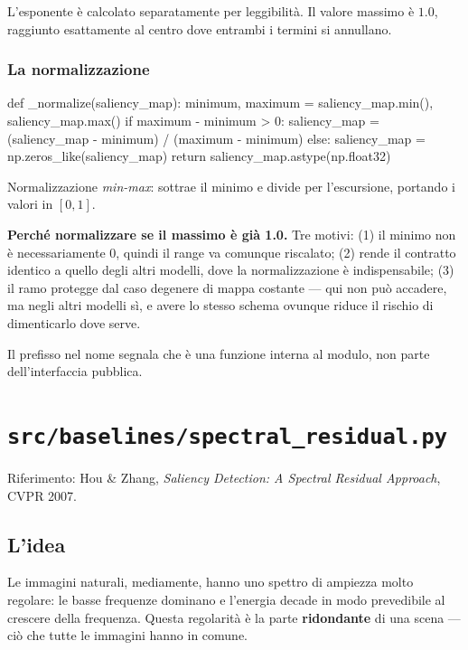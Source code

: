 L'esponente è calcolato separatamente per leggibilità. Il valore massimo è $1.0$, raggiunto
esattamente al centro dove entrambi i termini si annullano.

\subsubsection{La normalizzazione}

\begin{idebox}
\begin{pycode}
def _normalize(saliency_map):
    minimum, maximum = saliency_map.min(), saliency_map.max()
    if maximum - minimum > 0:
        saliency_map = (saliency_map - minimum) / (maximum - minimum)
    else:
        saliency_map = np.zeros_like(saliency_map)
    return saliency_map.astype(np.float32)
\end{pycode}
\end{idebox}

Normalizzazione \emph{min-max}: sottrae il minimo e divide per l'escursione, portando i valori
in $[0,1]$.

\begin{nota}
\textbf{Perché normalizzare se il massimo è già 1.0.} Tre motivi: (1) il minimo non è
necessariamente 0, quindi il range va comunque riscalato; (2) rende il contratto identico a
quello degli altri modelli, dove la normalizzazione è indispensabile; (3) il ramo 
protegge dal caso degenere di mappa costante --- qui non può accadere, ma negli altri modelli sì,
e avere lo stesso schema ovunque riduce il rischio di dimenticarlo dove serve.
\end{nota}

Il prefisso \pyin{_} nel nome segnala che è una funzione interna al modulo, non parte
dell'interfaccia pubblica.

\section{\texttt{src/baselines/spectral\_residual.py}}

Riferimento: Hou \& Zhang, \emph{Saliency Detection: A Spectral Residual Approach}, CVPR 2007.

\subsection{L'idea}

Le immagini naturali, mediamente, hanno uno spettro di ampiezza molto regolare: le basse
frequenze dominano e l'energia decade in modo prevedibile al crescere della frequenza. Questa
regolarità è la parte \textbf{ridondante} di una scena --- ciò che tutte le immagini hanno in
comune.

